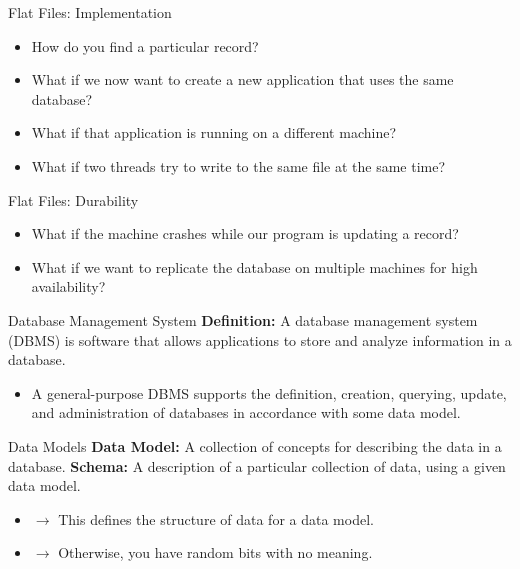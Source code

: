 \documentclass[aspectratio=169, 10pt]{beamer}
\begin{document}
\begin{frame}{Flat Files: Implementation}
    \begin{itemize}
        \item How do you find a particular record?
        \item What if we now want to create a new application that uses the same database?
        \item What if that application is running on a different machine?
        \item What if two threads try to write to the same file at the same time?
    \end{itemize}
\end{frame}

\begin{frame}{Flat Files: Durability}
    \begin{itemize}
        \item What if the machine crashes while our program is updating a record?
        \item What if we want to replicate the database on multiple machines for high availability?
    \end{itemize}
\end{frame}

\begin{frame}{Database Management System}
    \textbf{Definition:} A database management system (DBMS) is software that allows applications to store and analyze information in a database.
    \vspace{1em}
    \begin{itemize}
        \item A general-purpose DBMS supports the definition, creation, querying, update, and administration of databases in accordance with some data model.
    \end{itemize}
\end{frame}

\begin{frame}{Data Models}
    \textbf{Data Model:} A collection of concepts for describing the data in a database.
    \vspace{1em}
    \textbf{Schema:} A description of a particular collection of data, using a given data model.
    \begin{itemize}
        \item $\rightarrow$ This defines the structure of data for a data model.
        \item $\rightarrow$ Otherwise, you have random bits with no meaning.
    \end{itemize}
\end{frame}
\end{document}
